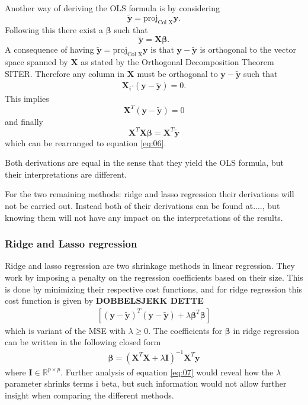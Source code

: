 \documentclass[uio,jmp,amsmath,amssymb,reprint,nofootinbib]{revtex4-1}
\numberwithin{equation}{section}
\newcommand{\lp}{\left(}
\newcommand{\rp}{\right)}
\newcommand{\lsb}{\left[}
\newcommand{\rsb}{\right]}
\newcommand{\pdot}{\boldsymbol{\cdot}}
\begin{document}
Another way of deriving the OLS formula is by considering
\begin{equation}
    \bm{\tilde{y}} = \text{proj}_{\text{Col X}}\bm{y}.
\end{equation}
Following this there exist a \(\bm{\beta}\) such that
\begin{equation}
    \bm{\tilde{y}} = \bm{X}\bm{\beta}.
\end{equation}
A consequence of having \(\bm{\tilde{y}} = \text{proj}_{\text{Col X}}\bm{y}\) is that \(\bm{y} - \bm{\tilde{y}}\) is orthogonal to the vector space spanned by \(\bm{X}\) as stated by the Orthogonal Decomposition Theorem SITER. Therefore any column in \(\bm{X}\) must be orthogonal to \(\bm{y} - \bm{\tilde{y}}\) such that
\begin{align}
    \bm{X}_i\pdot (\bm{y} - \bm{\tilde{y}}) = 0.
\end{align}
This implies
\begin{equation}
    \bm{X}^T(\bm{y} - \bm{\tilde{y}}) = 0
\end{equation}
and finally
\begin{equation}
    \bm{X}^T\bm{X}\bm{\beta} = \bm{X}^T\bm{\tilde{y}} 
\end{equation}
which can be rearranged to equation \ref{eq:06}.

Both derivations are equal in the sense that they yield the OLS formula, but their interpretations are different.

For the two remaining methods: ridge and lasso regression their derivations will not be carried out. Instead both of their derivations can be found at...., but knowing them will not have any impact on the interpretations of the results.

\subsubsection{Ridge and Lasso regression}

Ridge and lasso regression are two shrinkage methods in linear regression. They work by imposing a penalty on the regression coefficients based on their size. This is done by minimizing their respective cost functions, and for ridge regression this cost function is given by \textbf{DOBBELSJEKK DETTE}
\begin{align}
    \lsb \lp \bm{y} - \bm{\tilde{y}}\rp^T\lp \bm{y} - \bm{\tilde{y}}\rp + \lambda \bm{\beta}^T\bm{\beta}\rsb
\end{align}
which is variant of the MSE with \(\lambda \geq 0\). The coefficients for \(\bm{\beta}\) in ridge regression can be written in the following closed form
\begin{align}\label{eq:07}
    \bm{\beta} = (\bm{X}^T\bm{X} + \lambda\bm{I})^{-1}\bm{X}^T\bm{y}
\end{align}
where \(\bm{I} \in \mathbb{R}^{p\times p}\). Further analysis of equation \ref{eq:07} would reveal how the \(\lambda\) parameter shrinks terms i beta, but such information would not allow further insight when comparing the different methods.
\end{document}
